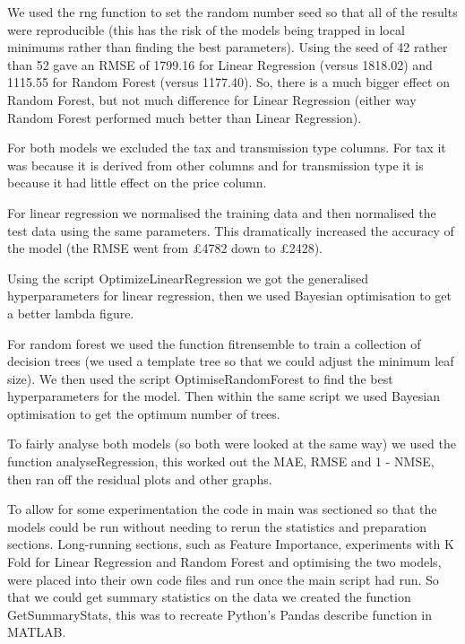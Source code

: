 \documentclass[a4pape, 11pt, english]{article}
\begin{document}
We used the rng function to set the random number seed so that all of the results were reproducible (this has the risk of the models being trapped in local minimums rather than finding the best parameters). Using the seed of 42 rather than 52 gave an RMSE of 1799.16 for Linear Regression (versus 1818.02) and 1115.55 for Random Forest (versus 1177.40). So, there is a much bigger effect on Random Forest, but not much difference for Linear Regression (either way Random Forest performed much better than Linear Regression).

For both models we excluded the tax and transmission type columns. For tax it was because it is derived from other columns and for transmission type it is because it had little effect on the price column.

For linear regression we normalised the training data and then normalised the test data using the same parameters. This dramatically increased the accuracy of the model (the RMSE went from £4782 down to £2428).

Using the script OptimizeLinearRegression we got the generalised hyperparameters for linear regression, then we used Bayesian optimisation to get a better lambda figure.

For random forest we used the function fitrensemble to train a collection of decision trees (we used a template tree so that we could adjust the minimum leaf size). We then used the script OptimiseRandomForest to find the best hyperparameters for the model. Then within the same script we used Bayesian optimisation to get the optimum number of trees.

To fairly analyse both models (so both were looked at the same way) we used the function analyseRegression, this worked out the MAE, RMSE and 1 - NMSE, then ran off the residual plots and other graphs.

To allow for some experimentation the code in main was sectioned so that the models could be run without needing to rerun the statistics and preparation sections. Long-running sections, such as Feature Importance, experiments with K Fold for Linear Regression and Random Forest and optimising the two models, were placed into their own code files and run once the main script had run.
So that we could get summary statistics on the data we created the function GetSummaryStats, this was to recreate Python's Pandas describe function in MATLAB. 




\end{document}
